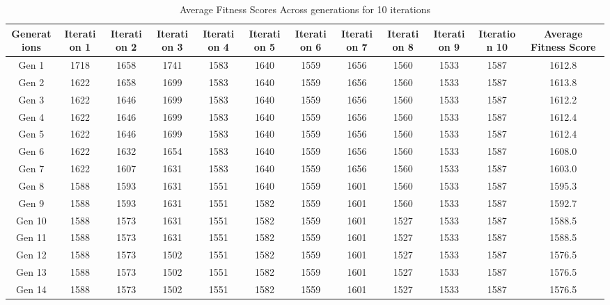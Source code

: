 \documentclass[12pt]{article}
\begin{document}
\begin{table}[h]
    \centering
    \caption{Average Fitness Scores Across generations for 10 iterations}
    \label{tab:average_fitness_scores}
    \begin{adjustbox}{max width=0.5\textwidth} %
        \begin{tabular}{*{12}{c}}
            \toprule
            Generations & Iteration 1 & Iteration 2 & Iteration 3 & Iteration 4 & Iteration 5 & Iteration 6 & Iteration 7 & Iteration 8 & Iteration 9 & Iteration 10 & Average Fitness Score \\
            \midrule
            Gen 1 & 1718 & 1658 & 1741 & 1583 & 1640 & 1559 & 1656 & 1560 & 1533 & 1587 & 1612.8 \\
            Gen 2 & 1622 & 1658 & 1699 & 1583 & 1640 & 1559 & 1656 & 1560 & 1533 & 1587 & 1613.8 \\
            Gen 3 & 1622 & 1646 & 1699 & 1583 & 1640 & 1559 & 1656 & 1560 & 1533 & 1587 & 1612.2 \\
            Gen 4 & 1622 & 1646 & 1699 & 1583 & 1640 & 1559 & 1656 & 1560 & 1533 & 1587 & 1612.4 \\
            Gen 5 & 1622 & 1646 & 1699 & 1583 & 1640 & 1559 & 1656 & 1560 & 1533 & 1587 & 1612.4 \\
            Gen 6 & 1622 & 1632 & 1654 & 1583 & 1640 & 1559 & 1656 & 1560 & 1533 & 1587 & 1608.0 \\
            Gen 7 & 1622 & 1607 & 1631 & 1583 & 1640 & 1559 & 1656 & 1560 & 1533 & 1587 & 1603.0 \\
            Gen 8 & 1588 & 1593 & 1631 & 1551 & 1640 & 1559 & 1601 & 1560 & 1533 & 1587 & 1595.3 \\
            Gen 9 & 1588 & 1593 & 1631 & 1551 & 1582 & 1559 & 1601 & 1560 & 1533 & 1587 & 1592.7 \\
            Gen 10 & 1588 & 1573 & 1631 & 1551 & 1582 & 1559 & 1601 & 1527 & 1533 & 1587 & 1588.5 \\
            Gen 11 & 1588 & 1573 & 1631 & 1551 & 1582 & 1559 & 1601 & 1527 & 1533 & 1587 & 1588.5 \\
            Gen 12 & 1588 & 1573 & 1502 & 1551 & 1582 & 1559 & 1601 & 1527 & 1533 & 1587 & 1576.5 \\
            Gen 13 & 1588 & 1573 & 1502 & 1551 & 1582 & 1559 & 1601 & 1527 & 1533 & 1587 & 1576.5 \\
            Gen 14 & 1588 & 1573 & 1502 & 1551 & 1582 & 1559 & 1601 & 1527 & 1533 & 1587 & 1576.5 \\

\end{tabular}
\end{adjustbox}
\end{table}
\end{document}
